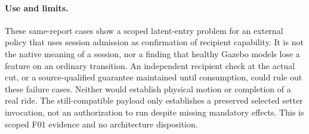 \documentclass[11pt]{article}
\begin{document}
\paragraph{Use and limits.}
These same-report cases show a scoped latent-entry problem for an
external policy that uses session admission as confirmation of
recipient capability. It is not the native meaning of a session,
nor a finding that healthy Gazebo models lose a feature on an
ordinary transition. An independent recipient check at the actual
cut, or a source-qualified guarantee maintained until consumption,
could rule out these failure cases. Neither would establish physical
motion or completion of a real ride. The still-compatible payload
only establishes a preserved selected setter invocation, not an
authorization to run despite missing mandatory effects.
This is scoped F01 evidence and no architecture disposition.
\end{document}
